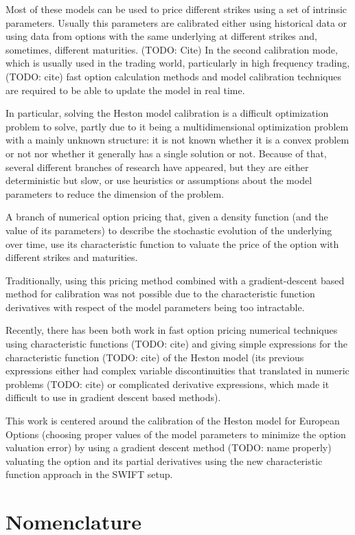 \documentclass[12,twoside]{mammeTFM}
\theoremstyle{definition}
\theoremstyle{remark}
\begin{document}
Most of these models can be used to price different strikes using a set of intrinsic parameters. Usually this parameters are calibrated either using historical data or using data from options with the same underlying at different strikes and, sometimes, different maturities. (TODO: Cite) In the second calibration mode, which is usually used in the trading world, particularly in high frequency trading, (TODO: cite) fast option calculation methods and model calibration techniques are required to be able to update the model in real time.

In particular, solving the Heston model calibration is a difficult optimization problem to solve, partly due to it being a multidimensional optimization problem with a mainly unknown structure: it is not known whether it is a convex problem or not nor whether it generally has a single solution or not. Because of that, several different branches of research have appeared, but they are either deterministic but slow, or use heuristics or assumptions about the model parameters to reduce the dimension of the problem.

A branch of numerical option pricing that, given a density function (and the value of its parameters) to describe the stochastic evolution of the underlying over time, use its characteristic function to valuate the price of the option with different strikes and maturities.

Traditionally, using this pricing method combined with a gradient-descent based method for calibration was not possible due to the characteristic function derivatives with respect of the model parameters being too intractable.

Recently, there has been both work in fast option pricing numerical techniques using characteristic functions (TODO: cite) and giving simple expressions for the characteristic function (TODO: cite) of the Heston model (its previous expressions either had complex variable discontinuities that translated in numeric problems (TODO: cite) or complicated derivative expressions, which made it difficult to use in gradient descent based methods).

This work is centered around the calibration of the Heston model for European Options (choosing proper values of the model parameters to minimize the option valuation error) by using a gradient descent method (TODO: name properly) valuating the option and its partial derivatives using the new characteristic function approach in the SWIFT setup.

\section{Nomenclature}
\end{document}
